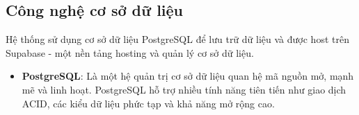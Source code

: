 \subsection{Công nghệ cơ sở dữ liệu}

Hệ thống sử dụng cơ sở dữ liệu PostgreSQL để lưu trữ dữ liệu và được host trên Supabase\cite{supabasedoc} - một nền tảng hosting và quản lý cơ sở dữ liệu.
\begin{itemize}
    \item \textbf{PostgreSQL}\cite{postgresqldoc}: Là một hệ quản trị cơ sở dữ liệu quan hệ mã nguồn mở, mạnh mẽ và linh hoạt. PostgreSQL hỗ trợ nhiều tính năng tiên tiến như giao dịch ACID, các kiểu dữ liệu phức tạp và khả năng mở rộng cao.
\end{itemize}